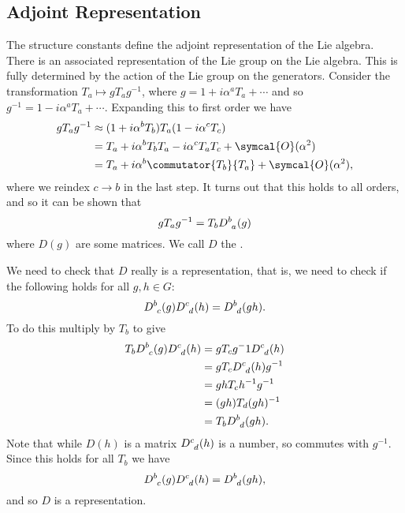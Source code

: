 \documentclass[fleqn]{NotesClass}
\newcommand{\order}{\symcal{O}}
\begin{document}
    \subsection{Adjoint Representation}
    The structure constants define the adjoint representation of the Lie algebra.
    There is an associated representation of the Lie group on the Lie algebra.
    This is fully determined by the action of the Lie group on the generators.
    Consider the transformation \(T_a \mapsto gT_ag^{-1}\), where \(g = 1 + i\alpha^aT_a + \dotsb\) and so \(g^{-1} = 1 - i\alpha^aT_a + \dotsb\).
    Expanding this to first order we have
    \begin{align}
        gT_ag^{-1} &\approx (1 + i\alpha^bT_b)T_a(1 - i\alpha^cT_c)\\
        &= T_a + i\alpha^bT_bT_a - i\alpha^cT_aT_c + \order(\alpha^2)\\
        &= T_a + i\alpha^b \commutator{T_b}{T_a} + \order(\alpha^2),
    \end{align}
    where we reindex \(c \to b\) in the last step.
    It turns out that this holds to all orders, and so it can be shown that
    \begin{equation}
        gT_ag^{-1} = T_b \tensor{D}{^b_a}(g)
    \end{equation}
    where \(D(g)\) are some matrices.
    We call \(D\) the .
    
    We need to check that \(D\) really is a representation, that is, we need to check if the following holds for all \(g, h \in G\):
    \begin{equation}
        \tensor{D}{^b_c}(g) \tensor{D}{^c_d}(h) = \tensor{D}{^b_d}(gh).
    \end{equation}
    To do this multiply by \(T_b\) to give
    \begin{align}
        T_b \tensor{D}{^b_c}(g) \tensor{D}{^c_d}(h) &= gT_cg^-1 \tensor{D}{^c_d}(h)\\
        &= gT_c\tensor{D}{^c_d}(h)g^{-1}\\
        &= ghT_ch^{-1}g^{-1}\\
        &= (gh)T_d(gh)^{-1}\\
        &= T_b \tensor{D}{^b_d}(gh).
    \end{align}
    Note that while \(D(h)\) is a matrix \(\tensor{D}{^c_d}(h)\) is a number, so commutes with \(g^{-1}\).
    Since this holds for all \(T_b\) we have
    \begin{equation}
        \tensor{D}{^b_c}(g) \tensor{D}{^c_d}(h) = \tensor{D}{^b_d}(gh),
    \end{equation}
    and so \(D\) is a representation.
    
\end{document}
